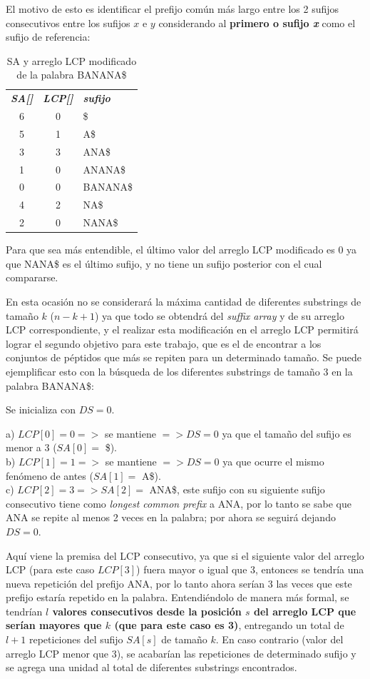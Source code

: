 El motivo de esto es identificar el prefijo común más largo entre los 2 sufijos consecutivos entre los sufijos $x$ e $y$ considerando al {\textbf{primero o sufijo \textit{x}}} como el sufijo de referencia:

\begin{table}[H]
	\centering
	\label{propuesta-21}
	\begin{tabular}{c c l}
		\textit{\textbf{SA[]}} & \textit{\textbf{LCP[]}} &\textit{\textbf{sufijo}}\\
		6 & 0 & \$\\
		5 & 1 & A\$\\
		3 & 3 & ANA\$\\
		1 & 0 & ANANA\$\\
		0 & 0 & BANANA\$\\
		4 & 2 & NA\$\\
		2 & 0 & NANA\$\\
	\end{tabular}
\caption{SA y arreglo LCP modificado de la palabra BANANA\$}
\end{table}

Para que sea más entendible, el último valor del arreglo LCP modificado es 0 ya que NANA\$ es el último sufijo, y no tiene un sufijo posterior con el cual compararse.

En esta ocasión no se considerará la máxima cantidad de diferentes substrings de tamaño $k$ ($n-k+1$) ya que todo se obtendrá del \textit{suffix array} y de su arreglo LCP correspondiente, y el realizar esta modificación en el arreglo LCP permitirá lograr el segundo objetivo para este trabajo, que es el de encontrar a los conjuntos de péptidos que más se repiten para un determinado tamaño. Se puede ejemplificar esto con la búsqueda de los diferentes substrings de tamaño 3 en la palabra BANANA\$:

Se inicializa con $DS = 0$.

a) $LCP[0]=0 =>$ se mantiene $=> DS=0$ ya que el tamaño del sufijo es menor a 3 ($SA[0]=$ \$).\\
b) $LCP[1]=1 =>$ se mantiene $=> DS=0$ ya que ocurre el mismo fenómeno de antes ($SA[1]=$ A\$).\\ 
c) $LCP[2]=3 => SA[2] =$ ANA\$, este sufijo con su siguiente sufijo consecutivo tiene como \textit{longest common prefix} a ANA, por lo tanto se sabe que ANA se repite al menos 2 veces en la palabra; por ahora se seguirá dejando $DS = 0$.

Aquí viene la premisa del LCP consecutivo, ya que si el siguiente valor del arreglo LCP (para este caso $LCP[3]$) fuera mayor o igual que 3, entonces se tendría una nueva repetición del prefijo ANA, por lo tanto ahora serían 3 las veces que este prefijo estaría repetido en la palabra. Entendiéndolo de manera más formal, se tendrían \textbf{$l$ valores consecutivos desde la posición $s$ del arreglo LCP que serían mayores que $k$ (que para este caso es 3)}, entregando un total de $l+1$ repeticiones del sufijo $SA[s]$ de tamaño $k$. En caso contrario (valor del arreglo LCP menor que 3), se acabarían las repeticiones de determinado sufijo y se agrega una unidad al total de diferentes substrings encontrados.

